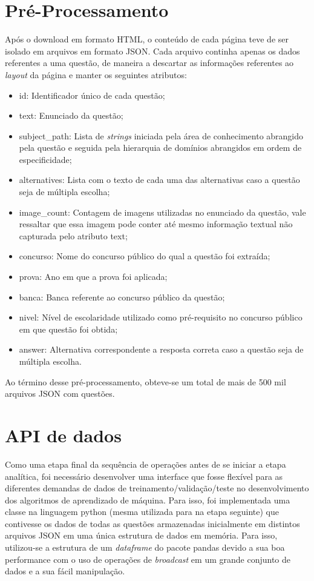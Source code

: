 \section{Pré-Processamento}

Após o download em formato HTML, o conteúdo de cada página teve de ser isolado em arquivos em formato JSON. Cada arquivo continha apenas os dados referentes a uma questão, de maneira a descartar as informações referentes ao \textit{layout} da página e manter os seguintes atributos:

\begin{itemize}
\item id: Identificador único de cada questão;
\item text: Enunciado da questão;
\item subject\_path: Lista de \textit{strings} iniciada pela área de conhecimento abrangido pela questão e seguida pela hierarquia de domínios abrangidos em ordem de especificidade;
\item alternatives: Lista com o texto de cada uma das alternativas caso a questão seja de múltipla escolha;
\item image\_count: Contagem de imagens utilizadas no enunciado da questão, vale ressaltar que essa imagem pode conter até mesmo informação textual não capturada pelo atributo text;
\item concurso: Nome do concurso público do qual a questão foi extraída;
\item prova: Ano em que a prova foi aplicada;
\item banca: Banca referente ao concurso público da questão;
\item nivel: Nível de escolaridade utilizado como pré-requisito no concurso público em que questão foi obtida;
\item answer: Alternativa correspondente a resposta correta caso a questão seja de múltipla escolha.
\end{itemize}

Ao término desse pré-processamento, obteve-se um total de mais de 500 mil arquivos JSON com questões.

\section{API de dados}
\label{dataset_api}

Como uma etapa final da sequência de operações antes de se iniciar a etapa analítica, foi necessário desenvolver uma interface que fosse flexível para as diferentes demandas de dados de treinamento/validação/teste no desenvolvimento dos algoritmos de aprendizado de máquina. Para isso, foi implementada uma classe na linguagem python (mesma utilizada para na etapa seguinte) que contivesse os dados de todas as questões armazenadas inicialmente em distintos arquivos JSON em uma única estrutura de dados em memória. Para isso, utilizou-se a estrutura de um \textit{dataframe} do pacote pandas devido a sua boa performance com o uso de operações de \textit{broadcast} em um grande conjunto de dados e a sua fácil manipulação.

